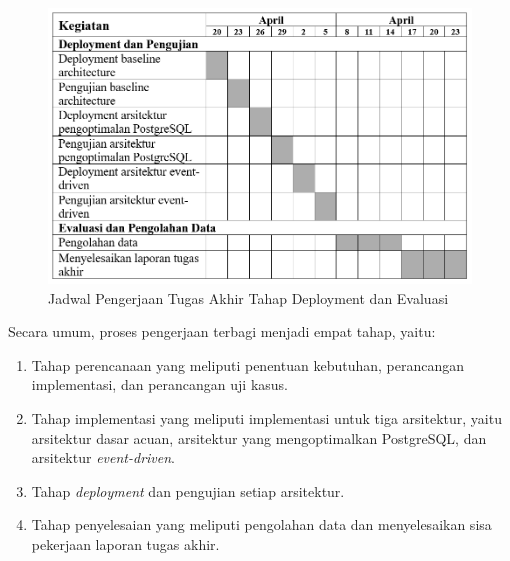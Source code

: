 \begin{figure}[ht]
    \centering
    \includegraphics[width=1\textwidth]{resources/schedule/jadwal-3.png}
    \caption{Jadwal Pengerjaan Tugas Akhir Tahap Deployment dan Evaluasi}
    \label{fig:jadwal pelaksanaan deployment}
\end{figure}

Secara umum, proses pengerjaan terbagi menjadi empat tahap, yaitu:

\begin{enumerate}
    \item Tahap perencanaan yang meliputi penentuan kebutuhan, perancangan implementasi, dan perancangan uji kasus.
    \item Tahap implementasi yang meliputi implementasi untuk tiga arsitektur, yaitu arsitektur dasar acuan, arsitektur yang mengoptimalkan PostgreSQL, dan arsitektur \textit{event-driven}.
    \item Tahap \textit{deployment} dan pengujian setiap arsitektur.
    \item Tahap penyelesaian yang meliputi pengolahan data dan menyelesaikan sisa pekerjaan laporan tugas akhir.
\end{enumerate}